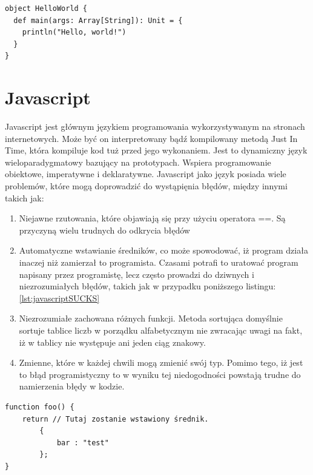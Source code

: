 \begin{lstlisting}[frame=single, numbers=none,captionpos=b, 
caption={Hello world napisany w języku Scala.}]
object HelloWorld {
  def main(args: Array[String]): Unit = {
    println("Hello, world!")
  }
}
\end{lstlisting}

\section{Javascript}

Javascript jest głównym językiem programowania wykorzystywanym na stronach internetowych. Może być on interpretowany bądź kompilowany metodą Just In Time, która kompiluje kod tuż przed jego wykonaniem. Jest to dynamiczny język wieloparadygmatowy bazujący na prototypach. Wspiera programowanie obiektowe, imperatywne i deklaratywne.\cite{AboutJS}
Javascript jako język posiada wiele problemów, które mogą doprowadzić do wystąpięnia błędów, między innymi takich jak:
\begin{enumerate}
	\item Niejawne rzutowania, które objawiają się przy użyciu operatora ==. Są przyczyną wielu trudnych do odkrycia błędów
	\item Automatyczne wstawianie średników, co może spowodować, iż program działa inaczej niż zamierzał to programista. Czasami potrafi to uratować program napisany przez programistę, lecz często prowadzi do dziwnych i niezrozumiałych błędów, takich jak w przypadku poniższego listingu: \ref{lst:javascriptSUCKS}
	\item Niezrozumiałe zachowana różnych funkcji. Metoda sortująca domyślnie sortuje tablice liczb w porządku alfabetycznym nie zwracając uwagi na fakt, iż w tablicy nie występuje ani jeden ciąg znakowy.
	\item Zmienne, które w każdej chwili mogą zmienić swój typ. Pomimo tego, iż jest to błąd programistyczny to w wyniku tej niedogodności powstają trudne do namierzenia błędy w kodzie.
\end{enumerate}

\begin{lstlisting}[label={lst:javascriptSUCKS},
frame=single, numbers=none,captionpos=b, 
caption={Przykład niepoprawnego kodu Javascript wynikłego z automatycznego wstawienia średnika}]
function foo() {
    return // Tutaj zostanie wstawiony średnik.
        {
            bar : "test"
        };
}
\end{lstlisting}


